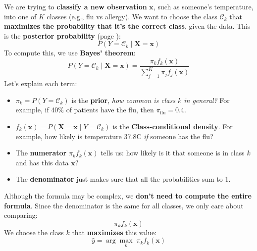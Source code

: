 \highspace
We are trying to \textbf{classify a new observation} $\mathbf{x}$, such as someone's temperature, into one of $K$ classes (e.g., flu vs allergy). We want to choose the class $\mathcal{C}_{k}$ that \textbf{maximizes the probability that it's the correct class}, given the data. This is the \textbf{posterior probability} (page \pageref{eq: posterior probability}):
\begin{equation*}
    P\left(Y = \mathcal{C}_k \mid \mathbf{X} = \mathbf{x}\right)
\end{equation*}
To compute this, we use \textbf{Bayes' theorem}:
\begin{equation}
    P\left(Y = \mathcal{C}_k \mid \mathbf{X} = \mathbf{x}\right) = \frac{\pi_k f_k\left(\mathbf{x}\right)}{\displaystyle\sum_{j=1}^{K} \pi_j f_j\left(\mathbf{x}\right)}
\end{equation}
Let's explain each term:
\begin{itemize}
    \item $\pi_k = P(Y = \mathcal{C}_k)$ is the \textbf{prior}, \emph{how common is class $k$ in general?} For example, if 40\% of patients have the flu, then $\pi_{\text{flu}} = 0.4$.

    \item $f_k(\mathbf{x}) = P(\mathbf{X} = \mathbf{x} \mid Y = \mathcal{C}_k)$ is the \textbf{Class-conditional density}. For example, how likely is temperature $37.8$\textdegree C \emph{if} someone has the flu?
    
    \item The \textbf{numerator} $\pi_k f_k(\mathbf{x})$ tells us: how likely is it that someone is in class $k$ and has this data $\mathbf{x}$?

    \item The \textbf{denominator} just makes sure that all the probabilities sum to 1.
\end{itemize}
Although the formula may be complex, we \textbf{don't need to compute the entire formula}. Since the denominator is the same for all classes, we only care about comparing:
\begin{equation*}
    \pi_{k} f_{k}\left(\mathbf{x}\right)
\end{equation*}
We choose the class $k$ that \textbf{maximizes} this value:
\begin{equation*}
    \hat{y} = \arg\max_k \; \pi_{k} f_{k}\left(\mathbf{x}\right)
\end{equation*}

